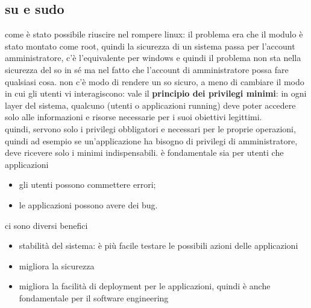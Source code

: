 \documentclass[12pt, oneside]{extbook} %
\begin{document}
\subsection{su e sudo}
come è stato possibile riuscire nel rompere linux: il problema era che il modulo è stato montato come root, quindi la sicurezza di un sistema passa per l'account amministratore, c'è l'equivalente per windows e quindi il problema non sta nella sicurezza del so in sé ma nel fatto che l'account di amministratore possa fare qualsiasi cosa. non c'è modo di rendere un so sicuro, a meno di cambiare il modo in cui gli utenti vi interagiscono: vale il \textbf{principio dei privilegi minimi}: in ogni layer del sistema, qualcuno (utenti o applicazioni running) deve poter accedere solo alle informazioni e risorse necessarie per i suoi obiettivi legittimi.\\quindi, servono solo i privilegi obbligatori e necessari per le proprie operazioni, quindi ad esempio se un'applicazione ha bisogno di privilegi di amministratore, deve ricevere solo i minimi indispensabili. è fondamentale sia per utenti che applicazioni
\begin{itemize}
\item gli utenti possono commettere errori;
\item le applicazioni possono avere dei bug.
\end{itemize}
ci sono diversi benefici
\begin{itemize}
\item stabilità del sistema: è più facile testare le possibili azioni delle applicazioni
\item migliora la sicurezza
\item migliora la facilità di deployment per le applicazioni, quindi è anche fondamentale per il software engineering
\end{itemize}
\end{document}

